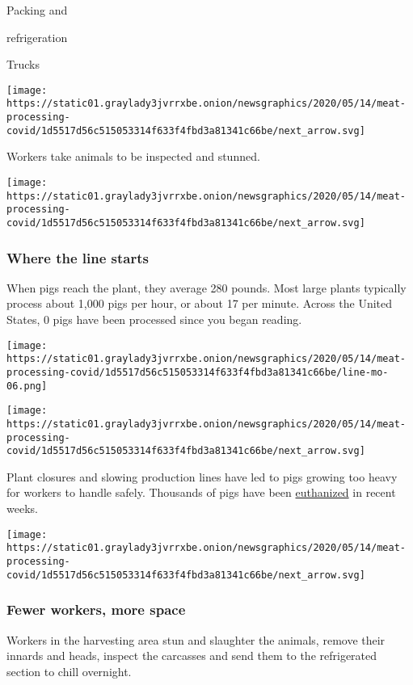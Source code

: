 Packing and

refrigeration

Trucks

\texttt{[image: https://static01.graylady3jvrrxbe.onion/newsgraphics/2020/05/14/meat-processing-covid/1d5517d56c515053314f633f4fbd3a81341c66be/next\_arrow.svg]}

Workers take animals to be inspected and stunned.

\texttt{[image: https://static01.graylady3jvrrxbe.onion/newsgraphics/2020/05/14/meat-processing-covid/1d5517d56c515053314f633f4fbd3a81341c66be/next\_arrow.svg]}

\hypertarget{where-the-line-starts}{%
\subsubsection{Where the line starts}\label{where-the-line-starts}}

When pigs reach the plant, they average 280 pounds. Most large plants
typically process about 1,000 pigs per hour, or about 17 per minute.
Across the United States, 0 pigs have been processed since you began
reading.

\texttt{[image: https://static01.graylady3jvrrxbe.onion/newsgraphics/2020/05/14/meat-processing-covid/1d5517d56c515053314f633f4fbd3a81341c66be/line-mo-06.png]}

\texttt{[image: https://static01.graylady3jvrrxbe.onion/newsgraphics/2020/05/14/meat-processing-covid/1d5517d56c515053314f633f4fbd3a81341c66be/next\_arrow.svg]}

Plant closures and slowing production lines have led to pigs growing too
heavy for workers to handle safely. Thousands of pigs have been
\href{https://www.nytimes3xbfgragh.onion/2020/05/14/business/coronavirus-farmers-killing-pigs.html}{euthanized}
in recent weeks.

\texttt{[image: https://static01.graylady3jvrrxbe.onion/newsgraphics/2020/05/14/meat-processing-covid/1d5517d56c515053314f633f4fbd3a81341c66be/next\_arrow.svg]}

\hypertarget{fewer-workers-more-space}{%
\subsubsection{Fewer workers, more
space}\label{fewer-workers-more-space}}

Workers in the harvesting area stun and slaughter the animals, remove
their innards and heads, inspect the carcasses and send them to the
refrigerated section to chill overnight.

